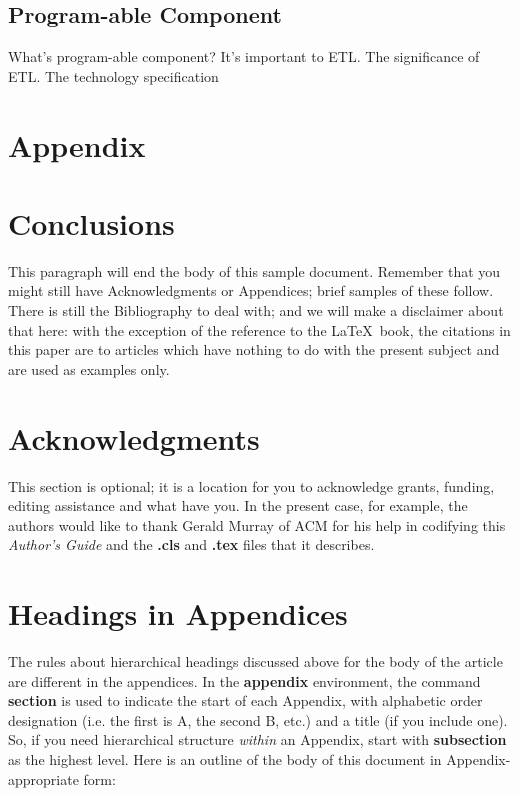 \documentclass{sig-alternate-05-2015}
\begin{document}
\subsection{Program-able Component}
What’s program-able component?
It’s important to ETL. The significance of ETL.
The technology specification 

\section{Appendix}

\section{Conclusions}
This paragraph will end the body of this sample document.
Remember that you might still have Acknowledgments or
Appendices; brief samples of these
follow.  There is still the Bibliography to deal with; and
we will make a disclaimer about that here: with the exception
of the reference to the \LaTeX\ book, the citations in
this paper are to articles which have nothing to
do with the present subject and are used as
examples only.

\section{Acknowledgments}
This section is optional; it is a location for you
to acknowledge grants, funding, editing assistance and
what have you.  In the present case, for example, the
authors would like to thank Gerald Murray of ACM for
his help in codifying this \textit{Author's Guide}
and the \textbf{.cls} and \textbf{.tex} files that it describes.

%

%
%
\appendix
\section{Headings in Appendices}
The rules about hierarchical headings discussed above for
the body of the article are different in the appendices.
In the \textbf{appendix} environment, the command
\textbf{section} is used to
indicate the start of each Appendix, with alphabetic order
designation (i.e. the first is A, the second B, etc.) and
a title (if you include one).  So, if you need
hierarchical structure
\textit{within} an Appendix, start with \textbf{subsection} as the
highest level. Here is an outline of the body of this
document in Appendix-appropriate form:
\end{document}
